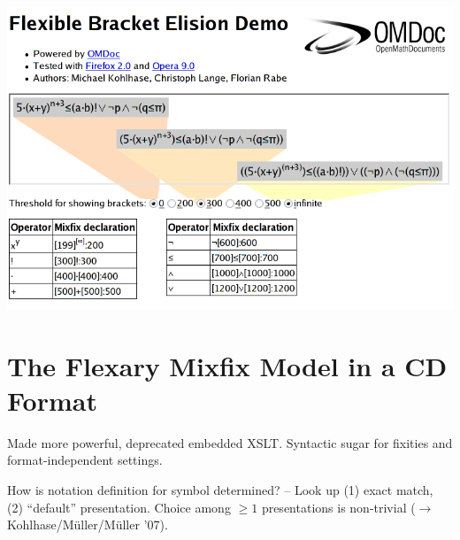 \documentclass[a0,portrait]{a0poster}
\begin{document}
\begin{multicols}{2}
\begin{center}
  \includegraphics[width=.84\linewidth]{demo-shot}
\end{center}
\section*{The Flexary Mixfix Model in a CD Format}
\label{sec:omdoc2}

Made {\omdoc} more powerful, deprecated embedded XSLT.  Syntactic sugar for
fixities and format-independent settings.

How is notation definition for symbol determined? -- Look up (1) exact match,
(2) ``default'' presentation.  Choice among $\ge 1$ presentations is non-trivial
($\to$ Kohlhase/Müller/Müller '07).


\end{multicols}
\end{document}
